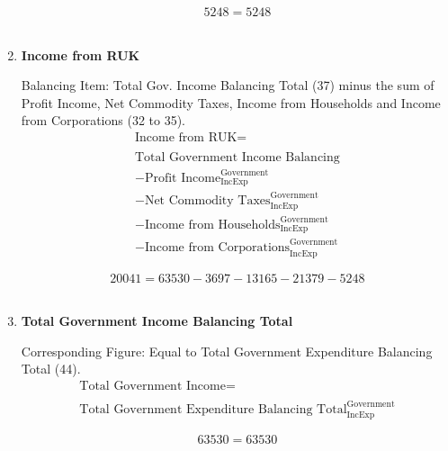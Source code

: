 \begin{enumerate}
\begin{equation} \nonumber
5248 = 5248
\end{equation}\\


\item \textbf {Income from RUK}

Balancing Item: Total Gov. Income Balancing Total (37) minus the sum of Profit Income, Net Commodity Taxes, Income from Households and Income from Corporations (32 to 35).\\

\begin{equation}
\begin{split}
\text{Income from RUK} =  \\ \\
\text{Total Government Income Balancing}\\
-\text{Profit Income}^\text{Government}_\text{IncExp}\\
-\text{Net Commodity Taxes}^\text{Government}_\text{IncExp}\\
-\text{Income from Households}^\text{Government}_\text{IncExp}\\
-\text{Income from Corporations}^\text{Government}_\text{IncExp}
\end{split} \label{eq:2.5.39}
\end{equation}

\begin{equation} \nonumber
20041 = 63530-3697-13165-21379-5248
\end{equation}\\


\item \textbf {Total Government Income Balancing Total}

Corresponding Figure: Equal to Total Government Expenditure Balancing Total (44).\\

\begin{equation}
\begin{split}
\text{Total Government Income} =  \\ \\
\text{Total Government Expenditure Balancing Total}^\text{Government}_\text{IncExp}
\end{split} \label{eq:2.5.40}
\end{equation}

\begin{equation} \nonumber
63530 = 63530
\end{equation}\\




\end{enumerate}
